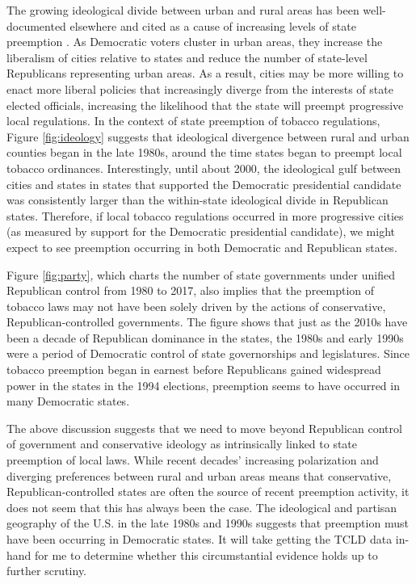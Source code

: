 \documentclass[12pt]{article}
\begin{document}
The growing ideological divide between urban and rural areas has been well-documented elsewhere \parencite[e.g.][]{chenUnintentionalGerrymanderingPolitical2013} and cited as a cause of increasing levels of state preemption \parencite{dupuisCityRightsEra2018,hicksHomeRuleBe2018}. As Democratic voters cluster in urban areas, they increase the liberalism of cities relative to states and reduce the number of state-level Republicans representing urban areas. As a result, cities may be more willing to enact more liberal policies that increasingly diverge from the interests of state elected officials, increasing the likelihood that the state will preempt progressive local regulations. In the context of state preemption of tobacco regulations, Figure \ref{fig:ideology} suggests that ideological divergence between rural and urban counties began in the late 1980s, around the time states began to preempt local tobacco ordinances. Interestingly, until about 2000, the ideological gulf between cities and states in states that supported the Democratic presidential candidate was consistently larger than the within-state ideological divide in Republican states. Therefore, if local tobacco regulations occurred in more progressive cities (as measured by support for the Democratic presidential candidate), we might expect to see preemption occurring in both Democratic and Republican states.


Figure \ref{fig:party}, which charts the number of state governments under unified Republican control from 1980 to 2017, also implies that the preemption of tobacco laws may not have been solely driven by the actions of conservative, Republican-controlled governments. The figure shows that just as the 2010s have been a decade of Republican dominance in the states, the 1980s and early 1990s were a period of Democratic control of state governorships and legislatures. Since tobacco preemption began in earnest before Republicans gained widespread power in the states in the 1994 elections, preemption seems to have occurred in many Democratic states. 

The above discussion suggests that we need to move beyond Republican control of government and conservative ideology as intrinsically linked to state preemption of local laws. While recent decades' increasing polarization and diverging preferences between rural and urban areas means that conservative, Republican-controlled states are often the source of recent preemption activity, it does not seem that this has always been the case. The ideological and partisan geography of the U.S. in the late 1980s and 1990s suggests that preemption must have been occurring in Democratic states. It will take getting the TCLD data in-hand for me to determine whether this circumstantial evidence holds up to further scrutiny.
\end{document}
